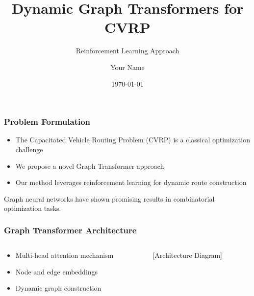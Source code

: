 \documentclass[aspectratio=169]{beamer}
\title{Dynamic Graph Transformers for CVRP}
\subtitle{Reinforcement Learning Approach}
\author{Your Name}
\institute{Your Institution}
\date{\today}
\begin{document}
\begin{frame}
    \titlepage
\end{frame}

\begin{frame}
    \frametitle{Problem Formulation}
    
    \begin{itemize}
        \item The Capacitated Vehicle Routing Problem (CVRP) is a classical optimization challenge
        \item We propose a novel Graph Transformer approach
        \item Our method leverages reinforcement learning for dynamic route construction
    \end{itemize}
    
    \bigskip
    
    Graph neural networks have shown promising results in combinatorial optimization tasks.
    
    
\end{frame}

\begin{frame}
    \frametitle{Graph Transformer Architecture}
    
    \begin{columns}
        \begin{column}{0.6\textwidth}
            \begin{itemize}
                \item Multi-head attention mechanism
                \item Node and edge embeddings
                \item Dynamic graph construction
            \end{itemize}
        \end{column}
        \begin{column}{0.4\textwidth}
            \begin{center}
                [Architecture Diagram]
            \end{center}
        \end{column}
    \end{columns}
    
    
\end{frame}
\end{document}
